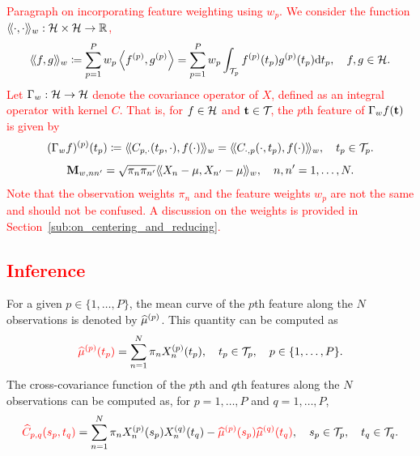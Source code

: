 \textcolor{red}{Paragraph on incorporating feature weighting using $w_p$.
We consider the function $\langle\!\langle\cdot, \cdot\rangle\!\rangle_w : \mathcal{H} \times \mathcal{H} \rightarrow \mathbb{R}$,
\begin{equation}\label{eq:innerprodH_weight}
    \langle\!\langle f, g\rangle\!\rangle_w \coloneqq \sum_{p=1}^{P} w_p\left\langle f^{(p)}, g^{(p)}\right\rangle = \sum_{p=1}^{P}w_p\int_{\mathcal{T}_{p}} f^{(p)}(t_p)g^{(p)}(t_p) {\rm d} t_p, \quad f, g \in \mathcal{H}.
\end{equation}
Let $\Gamma_w : \mathcal{H} \rightarrow \mathcal{H}$ denote the covariance operator of $X$, defined as an integral operator with kernel $C$. That is, for $f \in \mathcal{H}$ and $\mathbf{t} \in \mathcal{T}_{}$, the $p$th feature of $\Gamma_w f(\mathbf{t})$ is given by
\begin{equation}\label{eq:covariance_operator_components_weight}
    (\Gamma_w f)^{(p)}(t_p) \coloneqq \langle\!\langle C_{p, \cdot}(t_p, \cdot), f(\cdot)\rangle\!\rangle_w = \langle\!\langle C_{\cdot, p}(\cdot, t_p), f(\cdot)\rangle\!\rangle_w, \quad t_p \in \mathcal{T}_{p}.
\end{equation}
\begin{equation}\label{eq:gram_mat_weights}
    \mathbf{M}_{w, nn^\prime} = \sqrt{\pi_n \pi_{n^{\prime}}}\langle\!\langle X_n - \mu, X_{n^\prime} - \mu\rangle\!\rangle_w, \quad n, n^\prime = 1, \dots, N.
\end{equation}
Note that the observation weights $\pi_n$ and the feature weights $w_p$ are not the same and should not be confused. A discussion on the weights is provided in Section~\ref{sub:on_centering_and_reducing}.}

\subsection{\textcolor{red}{Inference}} %
\label{sub:inference}


For a given $p \in \{1, \dots, P\}$, the mean curve of the $p$th feature along the $N$ observations is denoted by \textcolor{red}{$\widehat{\mu}^{(p)}$}. This quantity can be computed as 
\begin{equation*}\label{eq:mu_estimation}
    \textcolor{red}{\widehat{\mu}^{(p)}(t_p)} = \sum_{n = 1}^N \pi_nX_n^{(p)}(t_p), \quad t_p \in \mathcal{T}_{p}, \quad p \in \{1, \dots, P\}.
\end{equation*}
The cross-covariance function of the $p$th and $q$th features along the $N$ observations can be computed as, for $p = 1, \dots, P$ and $q = 1, \dots, P$,
\begin{equation}\label{eq:cov_estimation}
    \textcolor{red}{\widehat{C}_{p, q}(s_p, t_q)} = \sum_{n = 1}^N \pi_nX_n^{(p)}(s_p)X_n^{(q)}(t_q) - \textcolor{red}{\widehat{\mu}^{(p)}(s_p)\widehat{\mu}^{(q)}(t_q)}, \quad s_p \in \mathcal{T}_{p}, \quad t_q \in \mathcal{T}_{q}.
\end{equation}

